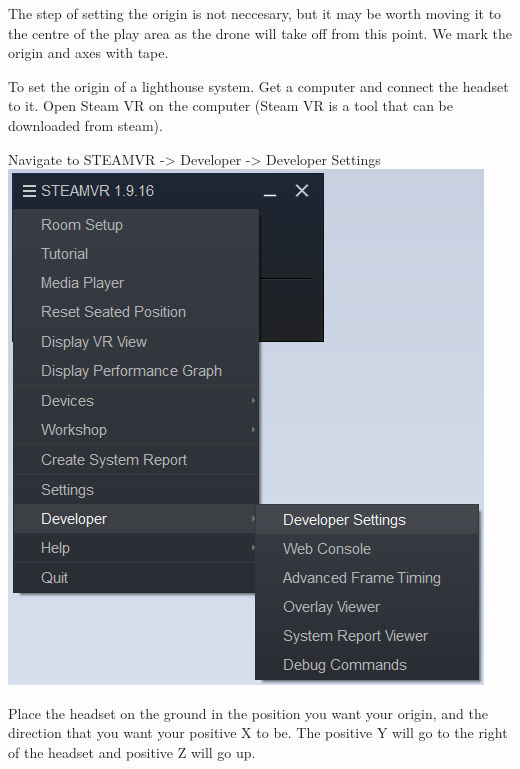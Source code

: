 The step of setting the origin is not neccesary, but it may be worth
moving it to the centre of the play area as the drone will take off from
this point. We mark the origin and axes with tape.

To set the origin of a lighthouse system. Get a computer and connect the
headset to it. Open Steam VR on the computer (Steam VR is a tool that
can be downloaded from steam).

Navigate to STEAMVR -\textgreater{} Developer -\textgreater{} Developer
Settings \includegraphics{images/devSettingsPath.png}

Place the headset on the ground in the position you want your origin,
and the direction that you want your positive X to be. The positive Y
will go to the right of the headset and positive Z will go up.

